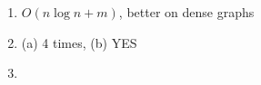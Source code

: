 \documentclass[11pt]{article}
\begin{document}
\begin{enumerate}
    \item $O(n \log{n} + m)$, better on dense graphs
    \item (a) 4 times, (b) YES
    \item 
\end{enumerate}
\end{document}
